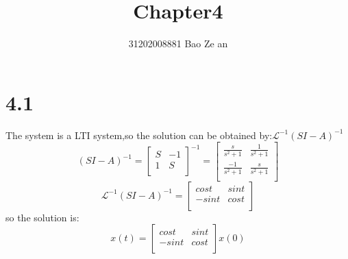 \documentclass{article}
\title{Chapter4}
\author{31202008881        \quad \quad \quad
          Bao Ze an}
\begin{document}
\setlength{\parindent}{2em}
\maketitle

\section*{4.1}
The system is a LTI system,so the solution can be obtained by:$\mathcal{L}^{-1}(SI-A)^{-1}$
\[(SI-A)^{-1}=
\left[
\begin{array}{cc}
S &-1\\
1 & S\\
\end{array}
\right]^{-1}
=
\left[
\begin{array}{cc}
\frac{s}{s^2+1} & \frac{1}{s^2+1}\\
\frac{-1}{s^2+1} & \frac{s}{s^2+1}\\
\end{array}
\right]
\]
\[\mathcal{L}^{-1}(SI-A)^{-1}=
\left[
\begin{array}{cc}
cost & sint\\
-sint & cost\\
\end{array}
\right]
\]
so the solution is:
\[
x(t)=
\left[
\begin{array}{cc}
cost & sint\\
-sint & cost\\
\end{array}
\right]
x(0)  
\]
\end{document}
